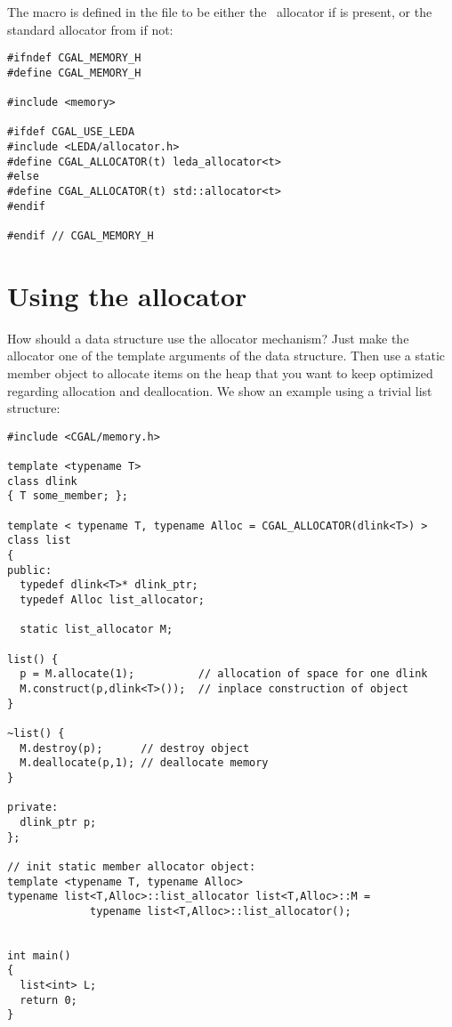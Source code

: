 The macro  is
defined in the file  to be either the \leda\ allocator
if \leda is present, or the standard allocator from  if not:

\begin{verbatim}
#ifndef CGAL_MEMORY_H
#define CGAL_MEMORY_H

#include <memory>

#ifdef CGAL_USE_LEDA
#include <LEDA/allocator.h>
#define CGAL_ALLOCATOR(t) leda_allocator<t>
#else
#define CGAL_ALLOCATOR(t) std::allocator<t>
#endif

#endif // CGAL_MEMORY_H
\end{verbatim}

\section{Using the allocator}
\label{sec:using_memory_allocator}

How should a data structure use the allocator mechanism? Just make the
allocator one of the template arguments of the data structure. Then
use a static member object to allocate items on the heap that you
want to keep optimized regarding allocation and deallocation. We
show an example using a trivial list structure:

\begin{verbatim}
#include <CGAL/memory.h>

template <typename T> 
class dlink 
{ T some_member; };

template < typename T, typename Alloc = CGAL_ALLOCATOR(dlink<T>) >
class list 
{
public:
  typedef dlink<T>* dlink_ptr;
  typedef Alloc list_allocator;

  static list_allocator M;

list() {
  p = M.allocate(1);          // allocation of space for one dlink
  M.construct(p,dlink<T>());  // inplace construction of object
}

~list() {
  M.destroy(p);      // destroy object
  M.deallocate(p,1); // deallocate memory
}

private:
  dlink_ptr p;
};

// init static member allocator object:
template <typename T, typename Alloc>
typename list<T,Alloc>::list_allocator list<T,Alloc>::M =
             typename list<T,Alloc>::list_allocator();


int main()
{
  list<int> L;
  return 0;
}
\end{verbatim}

